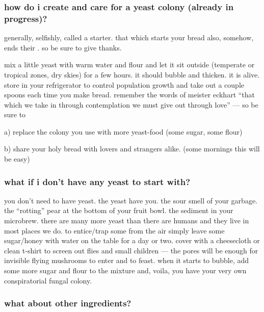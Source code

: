 \subsubsection{how do i create and care for a yeast colony (already in progress)?}

generally, selfishly, called a starter. that which starts your bread
also, somehow, ends their . so be sure to give thanks.

mix a little yeast with warm water and flour and let it sit outside
(temperate or tropical zones, dry skies) for a few hours. it should
bubble and thicken. it is alive. store in your refrigerator to control
population growth and take out a couple spoons each time you make
bread. remember the words of meister eckhart ``that which we take in
through contemplation we must give out through love'' --- so be
sure to

\begin{algorithm}
  \item[a)] replace the colony you use with more yeast-food (some sugar,
  some flour)

  \item[b)] share your holy bread with lovers and strangers alike. (some
  mornings this will be easy)
\end{algorithm}

\subsubsection{what if i don't have any yeast to start with?}

you don't need to have yeast. the yeast have you. the sour smell of
your garbage. the ``rotting'' pear at the bottom of your fruit
bowl. the sediment in your microbrew. there are many more yeast than
there are humans and they live in most places we do. to entice/trap
some from the air simply leave some sugar/honey with water on the
table for a day or two. cover with a cheesecloth or clean t-shirt to
screen out flies and small children --- the pores will be enough for
invisible flying mushrooms to enter and to feast. when it starts to
bubble, add some more sugar and flour to the mixture and, voila, you
have your very own conspiratorial fungal colony.

\subsubsection{what about other ingredients?}

